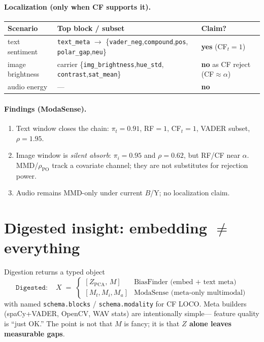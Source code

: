 \documentclass[11pt]{article}
\begin{document}
\paragraph{Localization (only when CF supports it).}
\begin{center}
\begin{tabular}{lll}
\toprule
Scenario & Top block / subset & Claim? \\
\midrule
text sentiment
  & \texttt{text\_meta} $\to$
    \{\texttt{vader\_neg},\texttt{compound},\texttt{pos},
     \texttt{polar\_gap},\texttt{neu}\}
  & \textbf{yes} (CF$_t{=}1$) \\
image brightness
  & carrier \{\texttt{img\_brightness},\texttt{hue\_std},
    \texttt{contrast},\texttt{sat\_mean}\}
  & \textbf{no} as CF reject (CF${\approx}\alpha$) \\
audio energy
  & --- & \textbf{no} \\
\bottomrule
\end{tabular}
\end{center}

\paragraph{Findings (ModaSense).}
\begin{enumerate}[leftmargin=*,itemsep=2pt]
  \item Text window closes the chain:
        $\pi_t{=}0.91$, RF${=}1$, CF$_t{=}1$, VADER subset, $\rho{=}1.95$.
  \item Image window is \emph{silent absorb}:
        $\pi_i{=}0.95$ and $\rho{=}0.62$, but RF/CF near $\alpha$.
        MMD/$\rho_{\mathrm{PO}}$ track a covariate channel; they are not
        substitutes for rejection power.
  \item Audio remains MMD-only under current $B$/Y; no localization claim.
\end{enumerate}

\section{Digested insight: embedding $\neq$ everything}
\label{sec:embed}
Digestion returns a typed object
\[
\texttt{Digested}:\quad
X \;=\;
\begin{cases}
[Z_{\mathrm{PCA}},\,M] & \text{BiasFinder (embed + text meta)}\\[2pt]
[M_t,M_i,M_a] & \text{ModaSense (meta-only multimodal)}
\end{cases}
\]
with named \texttt{schema.blocks} / \texttt{schema.modality} for CF LOCO.
Meta builders (spaCy+VADER, OpenCV, WAV stats) are intentionally simple---
feature quality is ``just OK.'' The point is not that $M$ is fancy; it is
that \textbf{$Z$ alone leaves measurable gaps}.
\end{document}
